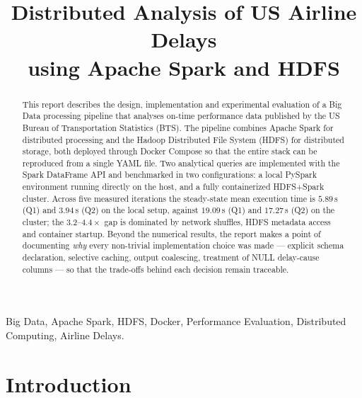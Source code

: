 \documentclass[conference]{IEEEtran}
\begin{document}
\title{Distributed Analysis of US Airline Delays\\
using Apache Spark and HDFS}

\author{
}

\maketitle

\begin{abstract}
This report describes the design, implementation and experimental
evaluation of a Big Data processing pipeline that analyses on-time
performance data published by the US Bureau of Transportation
Statistics (BTS). The pipeline combines Apache Spark for distributed
processing and the Hadoop Distributed File System (HDFS) for
distributed storage, both deployed through Docker Compose so that
the entire stack can be reproduced from a single YAML file.
Two analytical queries are implemented with the Spark DataFrame API
and benchmarked in two configurations: a local PySpark environment
running directly on the host, and a fully containerized HDFS+Spark
cluster. Across five measured iterations the steady-state mean
execution time is $5.89$\,s (Q1) and $3.94$\,s (Q2) on the local
setup, against $19.09$\,s (Q1) and $17.27$\,s (Q2) on the cluster;
the $3.2$--$4.4\times$ gap is dominated by network shuffles,
HDFS metadata access and container startup. Beyond the numerical
results, the report makes a point of documenting \emph{why} every
non-trivial implementation choice was made --- explicit schema
declaration, selective caching, output coalescing, treatment of
NULL delay-cause columns --- so that the trade-offs behind each
decision remain traceable.
\end{abstract}

\begin{IEEEkeywords}
Big Data, Apache Spark, HDFS, Docker, Performance Evaluation,
Distributed Computing, Airline Delays.
\end{IEEEkeywords}

\section{Introduction}
\end{document}

